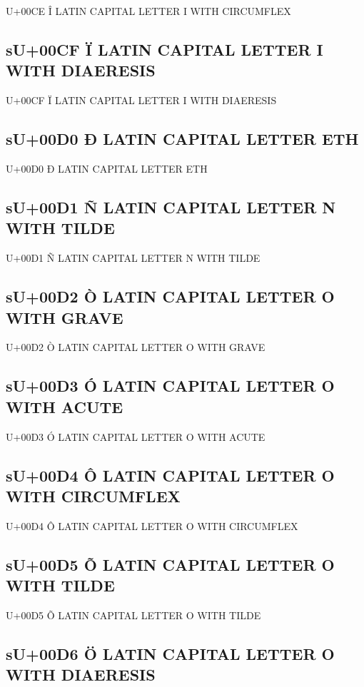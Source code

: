 U+00CE Î  LATIN CAPITAL LETTER I WITH CIRCUMFLEX

\subsection{sU+00CF Ï  LATIN CAPITAL LETTER I WITH DIAERESIS}

U+00CF Ï  LATIN CAPITAL LETTER I WITH DIAERESIS

\subsection{sU+00D0 Ð  LATIN CAPITAL LETTER ETH}

U+00D0 Ð  LATIN CAPITAL LETTER ETH

\subsection{sU+00D1 Ñ  LATIN CAPITAL LETTER N WITH TILDE}

U+00D1 Ñ  LATIN CAPITAL LETTER N WITH TILDE

\subsection{sU+00D2 Ò  LATIN CAPITAL LETTER O WITH GRAVE}

U+00D2 Ò  LATIN CAPITAL LETTER O WITH GRAVE

\subsection{sU+00D3 Ó  LATIN CAPITAL LETTER O WITH ACUTE}

U+00D3 Ó  LATIN CAPITAL LETTER O WITH ACUTE

\subsection{sU+00D4 Ô  LATIN CAPITAL LETTER O WITH CIRCUMFLEX}

U+00D4 Ô  LATIN CAPITAL LETTER O WITH CIRCUMFLEX

\subsection{sU+00D5 Õ  LATIN CAPITAL LETTER O WITH TILDE}

U+00D5 Õ  LATIN CAPITAL LETTER O WITH TILDE

\subsection{sU+00D6 Ö  LATIN CAPITAL LETTER O WITH DIAERESIS}

